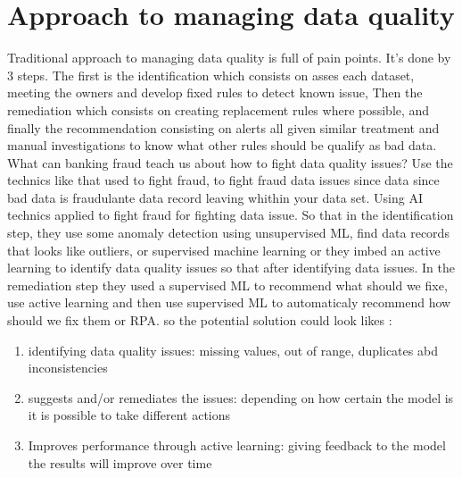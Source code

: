 \section{Approach to managing data quality }
Traditional approach to managing data quality is full of pain points. It's done by 3 steps. The first is the identification which consists on asses each dataset, meeting the owners and develop fixed rules to detect known issue, Then the remediation which consists on creating replacement rules where possible, and finally the recommendation consisting on alerts all given similar treatment and manual investigations to know what other rules should be qualify as bad data.
What can banking fraud teach us about how to fight data quality issues?
Use the technics like that used to fight fraud, to fight fraud data issues since data since bad data is fraudulante data record leaving whithin your data set.
Using AI technics applied to fight fraud for fighting data issue.
So that in the identification step, they use some anomaly detection using unsupervised ML, find data records that looks like outliers, or supervised machine learning or they imbed an active learning to identify data quality issues so that after identifying data issues. In the remediation step they used a supervised ML to recommend what should we fixe, use active learning and then use supervised ML to automaticaly recommend how should we fix them or RPA.
so the potential solution could look likes :
\begin{enumerate}
    \item identifying data quality issues: missing values, out of range, duplicates abd inconsistencies
    \item suggests and/or remediates the issues: depending on how certain the model is it is possible to take different actions
    \item Improves performance through active learning: giving feedback to the model the results will improve over time
\end{enumerate}

